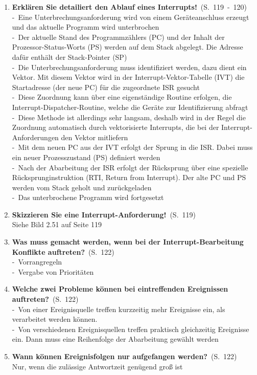 \documentclass[a4paper,12pt]{article}
\newcommand{\question}[3]{\pagebreak[3]\item {\textbf{#1?}}\ (S.\ #2)#3}
\newcommand{\statement}[3]{\pagebreak[3]\item {\textbf{#1!}}\ (S.\ #2)#3}
\newcommand{\catchword}[1]{\\-\ #1}
\newcommand{\normaltext}[1]{\\#1}
\newcommand{\page}[1]{#1}
\newcommand{\pages}[2]{#1\ -\ #2}
\begin{document}
\begin{enumerate}
  \statement{Erklären Sie detailiert den Ablauf eines Interrupts}{\pages{119}{120}}
  {
    \catchword{Eine Unterbrechungsanforderung wird von einem Geräteanschluss erzeugt
               und das aktuelle Programm wird unterbrochen}
    \catchword{Der aktuelle Stand des Programmzählers (PC) und der Inhalt der
               Prozessor-Status-Worts (PS) werden auf dem Stack abgelegt. Die
               Adresse dafür enthält der Stack-Pointer (SP)}
    \catchword{Die Unterbrechungsanforderung muss identifiziert werden, dazu dient
               ein Vektor. Mit diesem Vektor wird in der Interrupt-Vektor-Tabelle (IVT)
               die Startadresse (der neue PC) für die zugeordnete ISR gesucht}
    \catchword{Diese Zuordnung kann über eine eigenständige Routine erfolgen,
               die Interrupt-Dispatcher-Routine, welche die Geräte zur Identifizierung
               abfragt}
    \catchword{Diese Methode ist allerdings sehr langsam, deshalb wird in der Regel
               die Zuordnung automatisch durch vektorisierte Interrupts, die bei
               der Interrupt-Anforderungen den Vektor mitliefern}
    \catchword{Mit dem neuen PC aus der IVT erfolgt der Sprung in die ISR. Dabei muss
               ein neuer Prozesszustand (PS) definiert werden}
    \catchword{Nach der Abarbeitung der ISR erfolgt der Rücksprung über eine spezielle
               Rücksprunginstruktion (RTI, Return from Interrupt). Der alte PC und
               PS werden vom Stack geholt und zurückgeladen}
    \catchword{Das unterbrochene Programm wird fortgesetzt}
  }

  \statement{Skizzieren Sie eine Interrupt-Anforderung}{\page{119}}
  {
    \normaltext{Siehe Bild 2.51 auf Seite 119}
  }

  \question{Was muss gemacht werden, wenn bei der Interrupt-Bearbeitung
            Konflikte auftreten}{\page{122}}
  {
    \catchword{Vorrangregeln}
    \catchword{Vergabe von Prioritäten}
  }

  \question{Welche zwei Probleme können bei eintreffenden Ereignissen auftreten}{\page{122}}
  {
    \catchword{Von einer Ereignisquelle treffen kurzzeitig mehr Ereignisse ein,
               als verarbeitet werden können. }
    \catchword{Von verschiedenen Ereignisquellen treffen praktisch gleichzeitig Ereignisse ein.
               Dann muss eine Reihenfolge der Abarbeitung gewählt werden}
  }

  \question{Wann können Ereignisfolgen nur aufgefangen werden}{\page{122}}
  {
    \normaltext{Nur, wenn die zulässige Antwortzeit genügend groß ist}
  }


\end{enumerate}
\end{document}
